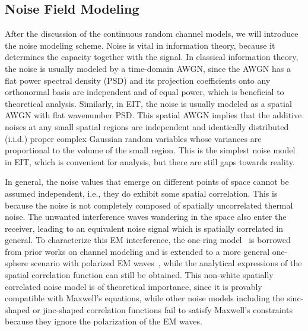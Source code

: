 \documentclass[journal,twocolumn]{IEEEtran}
\begin{document}
\subsection{Noise Field Modeling}
After the discussion of the continuous random channel models, we will introduce the noise modeling scheme. 
Noise is vital in information theory, because it determines the capacity together with the signal. 
In classical information theory, the noise is usually modeled by a time-domain AWGN, since the AWGN has a flat power spectral density (PSD) and its projection coefficients onto any orthonormal basis are independent and of equal power, which is beneficial to theoretical analysis. 
Similarly, in EIT, the noise is usually modeled as a spatial AWGN with flat wavenumber PSD. This spatial AWGN implies that the additive noises at any small spatial regions are independent and identically distributed (i.i.d.) proper complex Gaussian random variables whose variances are proportional to the volume of the small region. This is the simplest noise model in EIT, which is convenient for analysis, but there are still gaps towards reality. 

In general, the noise values that emerge on different points of space cannot be assumed independent, i.e., they do exhibit some spatial correlation. 
This is because the noise is not completely composed of spatially uncorrelated thermal noise. 
The unwanted interference waves wandering in the space also enter the receiver, leading to an equivalent noise signal which is spatially correlated in general. 
To characterize this EM interference, the one-ring model~\cite{byers2004spatially} is borrowed from prior works on channel modeling and is extended to a more general one-sphere scenario with polarized EM waves~\cite{wan2022mutual}, while the analytical expressions of the spatial correlation function can still be obtained. 
This non-white spatially correlated noise model is of theoretical importance, since it is provably compatible with Maxwell's equations, while other noise models including the sinc-shaped or jinc-shaped correlation functions fail to satisfy Maxwell's constraints because they ignore the polarization of the EM waves. 
\end{document}
